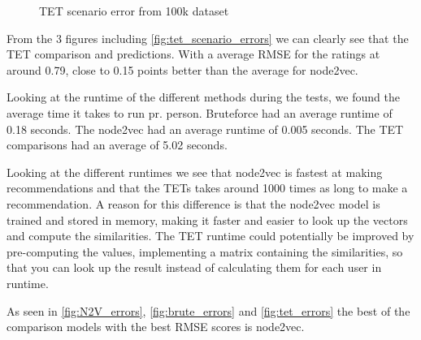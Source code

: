 \begin{figure}[H]
	\centering
	\begin{adjustbox}{width=0.5\textwidth}
		
	\end{adjustbox}
	\caption{TET scenario error from 100k dataset}
	\label{fig:tet_scenario_errors}
\end{figure}

From the $3$ figures including \autoref{fig:tet_scenario_errors} we can clearly see that the TET comparison and predictions.
With a average RMSE for the ratings at around 0.79, close to 0.15 points better than the average for node2vec.

Looking at the runtime of the different methods during the tests, we found the average time it takes to run pr. person.
Bruteforce had an average runtime of 0.18 seconds.
The node2vec had an average runtime of 0.005 seconds.
The TET comparisons had an average of 5.02 seconds.

Looking at the different runtimes we see that node2vec is fastest at making recommendations and that the TETs takes around 1000 times as long to make a recommendation.
A reason for this difference is that the node2vec model is trained and stored in memory, making it faster and easier to look up the vectors and compute the similarities.
The TET runtime could potentially be improved by pre-computing the values, implementing a matrix containing the similarities, so that you can look up the result instead of calculating them for each user in runtime.

As seen in \autoref{fig:N2V_errors}, \ref{fig:brute_errors} and \ref{fig:tet_errors} the best of the comparison models with the best RMSE scores is node2vec.